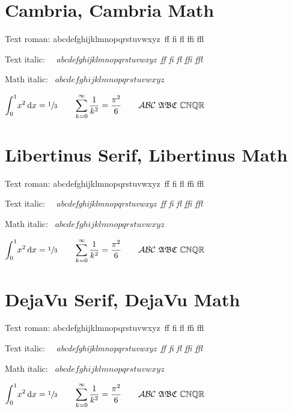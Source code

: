 \documentclass{article}
\newcommand{\abc}{abcdefghijklmnopqrstuvwxyz}
\newcommand{\ligs}{\ ff fi fl ffi ffl}
\newcommand{\abctextrm}{Text roman:  \abc\ligs}
\newcommand{\abctextit}{Text italic: \ \ \textit{\abc\ligs}}
\newcommand{\abcmathit}{Math italic: \ $\abc$}
\newcommand{\formulas}{%
  $\displaystyle
   \int_{0}^{1}\! x^{2}\,\mathrm{d}x = \sfrac{1}{3} 
   \qquad
   \sum_{k=0}^{\infty} \frac{1}{k^{2}}=\frac{\pi^{2}}{6}
   \qquad 
   \mathcal{ABC}\ \mathfrak{ABC}\ \mathbb{CNQR}$}
\newcommand{\doall}{\abctextrm\par\abctextit\par\abcmathit\par\formulas}
\begin{document}
\section*{Cambria, Cambria Math}
\doall

\clearpage
\setmainfont{Libertinus Serif}
\section*{Libertinus Serif, Libertinus Math}
\doall

\setmainfont{DejaVu Serif}
\section*{DejaVu Serif, DejaVu Math}
\doall


\end{document}
